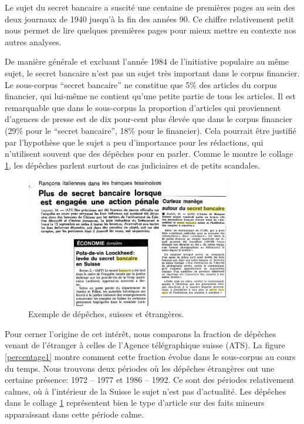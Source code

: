 \documentclass[a4paper, 11pt]{article}
\begin{document}
Le sujet du secret bancaire a suscité une centaine de premières pages au
sein des deux journaux de 1940 jusqu'à la fin des années 90. Ce chiffre
relativement petit nous permet de lire quelques premières pages pour
mieux mettre en contexte nos autres analyses.

De manière générale et excluant l'année 1984 de l'initiative populaire
au même sujet, le secret bancaire n'est pas un sujet très important dans
le corpus financier. Le sous-corpus ``secret bancaire'' ne constitue que
5\% des articles du corpus financier, qui lui-même ne contient qu'une
petite partie de tous les articles. Il est remarquable que dans le
sous-corpus la proportion d'articles qui proviennent d'agences de presse
est de dix pour-cent plus élevée que dans le corpus financier (29\% pour
le ``secret bancaire'', 18\% pour le financier). Cela pourrait être
justifié par l'hypothèse que le sujet a peu d'importance pour les
rédactions, qui n'utilisent souvent que des dépêches pour en parler.
Comme le montre le collage \ref{depeches}, les dépêches parlent surtout
de cas judiciaires et de petits scandales.

\begin{figure}
\centering
\includegraphics[width=0.8\textwidth ]{analysis/agencies_collage.png}
\caption{\label{depeches} Exemple de dépêches, suisses et étrangères.}
\end{figure}

Pour cerner l'origine de cet intérêt, nous comparons la fraction de
dépêches venant de l'étranger à celles de l'Agence télégraphique suisse
(ATS). La figure \ref{percentage1} montre comment cette fraction évolue
dans le sous-corpus au cours du temps. Nous trouvons deux périodes où
les dépêches étrangères ont une certaine présence: 1972 -- 1977 et 1986
-- 1992. Ce sont des périodes relativement calmes, où à l'intérieur de
la Suisse le sujet n'est pas d'actualité. Les dépêches dans le collage
\ref{depeches} représentent bien le type d'article sur des faits mineurs
apparaissant dans cette période calme.
\end{document}
